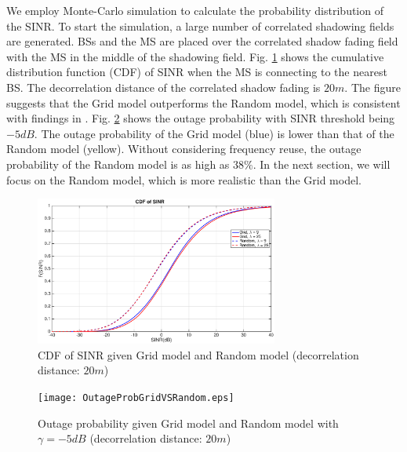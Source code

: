 \documentclass[journal,10pt]{IEEEtran}
\begin{document}
 \par We employ Monte-Carlo simulation to calculate the probability distribution of the SINR. To start the simulation, a large number of correlated shadowing fields are generated. BSs and the MS are placed over the correlated shadow fading field with the MS in the middle of the shadowing field. Fig. \ref{4:cdf1} shows the cumulative distribution function (CDF) of SINR when the MS is connecting to the nearest BS. The decorrelation distance of the correlated shadow fading is $20m$. The figure suggests that the Grid model outperforms the Random model, which is consistent with findings in \cite{andrews2011tractable}. Fig. \ref{4:outage1} shows the outage probability with SINR threshold being $-5dB$. The outage probability of the Grid model (blue) is lower than that of the Random model (yellow). Without considering frequency reuse, the outage probability of the Random model is as high as $38\%$. In the next section, we will focus on the Random model, which is more realistic than the Grid model.
 \begin{figure}
 \centering
 \includegraphics[width=8cm]{GridVSRandom.eps}
 \caption{CDF of SINR given Grid model and Random model (decorrelation distance: $20m$)}
 \label{4:cdf1}
 \end{figure}
 \begin{figure}
 \centering
 \texttt{[image: OutageProbGridVSRandom.eps]}
 \caption{Outage probability given Grid model and Random model with $\gamma = -5dB$ (decorrelation distance: $20m$)}
 \label{4:outage1}
 \end{figure}
\end{document}
